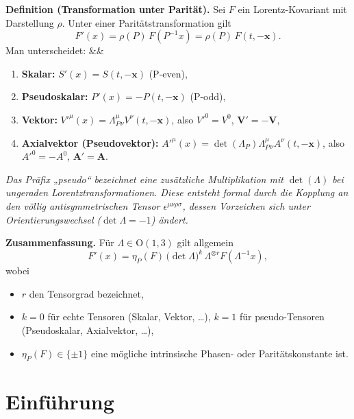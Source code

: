 \documentclass[10pt, letterpaper]{article}
\newcommand{\Ogroup}{\mathrm{O}}
\newenvironment{romanenum}[1][]
  {%
    \ifx&#1&
    \else
      \textbf{#1}\quad
    \fi
    \begin{enumerate}[label=\roman*)]
  }
  {%
    \end{enumerate}%
  }
\newenvironment{note}{\par\begingroup\color{hellblau}\itshape}{\par\endgroup}
\newenvironment{customTheorem}
  {\vspace{10pt}%
   \begin{mdframed}[
     backgroundcolor=gray!20,
     linewidth=0pt,
     innertopmargin=10pt,
     innerbottommargin=10pt,
     skipabove=\dimexpr\topsep+\ht\strutbox\relax,
     skipbelow=\topsep,
   ]}
  {\end{mdframed}
   \vspace{10pt}%
  }
\begin{document}
\begin{customTheorem}
\textbf{Definition (Transformation unter Parität).}
Sei $F$ ein Lorentz-Kovariant mit Darstellung $\rho$. Unter einer Paritätstransformation gilt
\[
F'(x)=\rho(P)\,F(P^{-1}x)=\rho(P)\,F(t,-\mathbf{x}).
\]
Man unterscheidet:
\begin{romanenum}
\item \textbf{Skalar:} $S'(x)=S(t,-\mathbf{x})$ (P-even),
\item \textbf{Pseudoskalar:} $P'(x)=-P(t,-\mathbf{x})$ (P-odd),
\item \textbf{Vektor:} $V'^{\mu}(x)=\Lambda_P^{\mu}{}_{\nu}V^{\nu}(t,-\mathbf{x})$,
      also $V'^0=V^0$, $\mathbf{V}'=-\mathbf{V}$,
\item \textbf{Axialvektor (Pseudovektor):} 
      $A'^{\mu}(x)=\det(\Lambda_P)\Lambda_P^{\mu}{}_{\nu}A^{\nu}(t,-\mathbf{x})$,
      also $A'^0=-A^0$, $\mathbf{A}'=\mathbf{A}$.
\end{romanenum}
\end{customTheorem}

\begin{note}
Das Präfix \emph{„pseudo“} bezeichnet eine zusätzliche Multiplikation mit $\det(\Lambda)$
bei ungeraden Lorentztransformationen. 
Diese entsteht formal durch die Kopplung an den völlig antisymmetrischen Tensor
$\epsilon^{\mu\nu\rho\sigma}$, dessen Vorzeichen sich unter 
Orientierungswechsel ($\det\Lambda=-1$) ändert.
\end{note}

\begin{customTheorem}
\textbf{Zusammenfassung.}
Für $\Lambda\in\Ogroup(1,3)$ gilt allgemein
\[
F'(x)
=\eta_P(F)\,\big(\det\Lambda\big)^k\,\Lambda^{\otimes r}F(\Lambda^{-1}x),
\]
wobei
\begin{itemize}
\item $r$ den Tensorgrad bezeichnet,
\item $k=0$ für echte Tensoren (Skalar, Vektor, \dots),
      $k=1$ für pseudo-Tensoren (Pseudoskalar, Axialvektor, \dots),
\item $\eta_P(F)\in\{\pm1\}$ eine mögliche intrinsische Phasen- oder Paritätskonstante ist.
\end{itemize}
\end{customTheorem}


\pagebreak



\section{Einführung}
\end{document}
